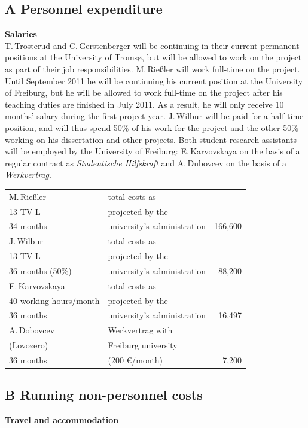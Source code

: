 \documentclass[a4paper,12pt]{article}
\begin{document}
{{\subsection*{A Personnel expenditure}
\noindent \textbf{Salaries}\\
T.\,Trosterud and C.\,Gersten\-berger will be continuing in their current permanent positions at the University of Tromsø, but will be allowed to work on the project as part of their job responsibilities. M.\,Rießler will work full-time on the project. Until September 2011 he will be continuing his current position at the University of Freiburg, but he will be allowed to work full-time on the project after his teaching duties are finished in July 2011. As a result, he will only receive 10 months' salary during the first project year. J.\,Wilbur will be paid for a half-time position, and will thus spend 50\% of his work for the project and the other 50\% working on his dissertation and other projects. %
 Both student research assistants will be employed by the University of Freiburg: E.\,Karvovskaya on the basis of a regular contract as {\it Studentische Hilfskraft} and A.\,Dubovcev on the basis of a {\it Werkvertrag}.
\newpage
\begin{longtable}{| l | l | r |}
\hline
M.\,Rießler&total costs as&\\
13 TV-L&projected by the&\\
34 months&university's administration&166,600\\
\hline
J.\,Wilbur&total costs as&\\
13 TV-L&projected by the&\\
36 months (50\%)&university's administration&88,200\\
\hline
E.\,Karvovskaya&total costs as&\\
40 working hours/month& projected by the&\\
36 months&university's administration&16,497\\
\hline
A.\,Dobovcev	&Werkvertrag with	&\\
(Lovozero)	&Freiburg university	&\\
36 months		&(200 €/month)		&7,200\\
\hline
\end{longtable}

\subsection*{B Running non-personnel costs}
\noindent \textbf{Travel and accommodation}

}}
\end{document}
